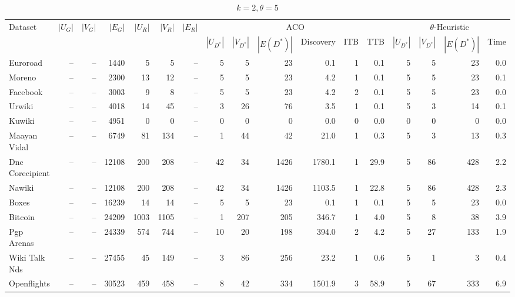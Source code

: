 \begin{table}[htbp]
  \centering
  \caption{$k=2, \theta=5$}

  \begin{adjustwidth}{-5cm}{-5cm}
  \centering
  \setlength{\tabcolsep}{3.5pt} %
  \begin{tabular}{l *{16}{r}} %
    \toprule
    Dataset & $|U_G|$ & $|V_G|$ & $|E_G|$ & $|U_R|$ & $|V_R|$ & $|E_R|$ & \multicolumn{6}{c}{ACO} & \multicolumn{4}{c}{$\theta$-Heuristic} \\
    \cmidrule(lr){8-13} \cmidrule(lr){14-17}
    & & & & & & & $|U_{D^*}|$ & $|V_{D^*}|$ & $|E(D^*)|$ & Discovery & ITB & TTB & $|U_{D^*}|$ & $|V_{D^*}|$ & $|E(D^*)|$ & Time \\
    \midrule
    Euroroad & -- & -- & 1440 & 5 & 5 & -- & 5 & 5 & 23 & 0.1 & 1 & 0.1 & 5 & 5 & 23 & 0.0 \\
    Moreno & -- & -- & 2300 & 13 & 12 & -- & 5 & 5 & 23 & 4.2 & 1 & 0.1 & 5 & 5 & 23 & 0.1 \\
    Facebook & -- & -- & 3003 & 9 & 8 & -- & 5 & 5 & 23 & 4.2 & 2 & 0.1 & 5 & 5 & 23 & 0.0 \\
    Urwiki & -- & -- & 4018 & 14 & 45 & -- & 3 & 26 & 76 & 3.5 & 1 & 0.1 & 5 & 3 & 14 & 0.1 \\
    Kuwiki & -- & -- & 4951 & 0 & 0 & -- & 0 & 0 & 0 & 0.0 & 0 & 0.0 & 0 & 0 & 0 & 0.0 \\
    Maayan Vidal & -- & -- & 6749 & 81 & 134 & -- & 1 & 44 & 42 & 21.0 & 1 & 0.3 & 5 & 3 & 13 & 0.3 \\
    Dnc Corecipient & -- & -- & 12108 & 200 & 208 & -- & 42 & 34 & 1426 & 1780.1 & 1 & 29.9 & 5 & 86 & 428 & 2.2 \\
    Nawiki & -- & -- & 12108 & 200 & 208 & -- & 42 & 34 & 1426 & 1103.5 & 1 & 22.8 & 5 & 86 & 428 & 2.3 \\
    Boxes & -- & -- & 16239 & 14 & 14 & -- & 5 & 5 & 23 & 0.1 & 1 & 0.1 & 5 & 5 & 23 & 0.0 \\
    Bitcoin & -- & -- & 24209 & 1003 & 1105 & -- & 1 & 207 & 205 & 346.7 & 1 & 4.0 & 5 & 8 & 38 & 3.9 \\
    Pgp Arenas & -- & -- & 24339 & 574 & 744 & -- & 10 & 20 & 198 & 394.0 & 2 & 4.2 & 5 & 27 & 133 & 1.9 \\
    Wiki Talk Nds & -- & -- & 27455 & 45 & 149 & -- & 3 & 86 & 256 & 23.2 & 1 & 0.6 & 5 & 1 & 3 & 0.4 \\
    Openflights & -- & -- & 30523 & 459 & 458 & -- & 8 & 42 & 334 & 1501.9 & 3 & 58.9 & 5 & 67 & 333 & 6.9 \\

\end{tabular}
\end{adjustwidth}
\end{table}
